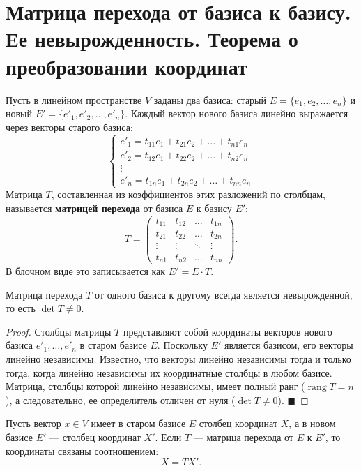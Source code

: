 \section{Матрица перехода от базиса к базису. Ее невырожденность. Теорема о преобразовании координат}

\begin{definition}
Пусть в линейном пространстве $V$ заданы два базиса: старый $E = \{e_1, e_2, \dots, e_n\}$ и новый $E' = \{e'_1, e'_2, \dots, e'_n\}$. 
Каждый вектор нового базиса линейно выражается через векторы старого базиса:
\[
\begin{cases}
e'_1 = t_{11}e_1 + t_{21}e_2 + \dots + t_{n1}e_n \\
e'_2 = t_{12}e_1 + t_{22}e_2 + \dots + t_{n2}e_n \\
\vdots \\
e'_n = t_{1n}e_1 + t_{2n}e_2 + \dots + t_{nn}e_n
\end{cases}
\]
Матрица $T$, составленная из коэффициентов этих разложений по столбцам, называется \textbf{матрицей перехода} от базиса $E$ к базису $E'$:
\[
T = \begin{pmatrix}
t_{11} & t_{12} & \dots & t_{1n} \\
t_{21} & t_{22} & \dots & t_{2n} \\
\vdots & \vdots & \ddots & \vdots \\
t_{n1} & t_{n2} & \dots & t_{nn}
\end{pmatrix}.
\]
В блочном виде это записывается как $E' = E \cdot T$.
\end{definition}

\begin{theorem}
Матрица перехода $T$ от одного базиса к другому всегда является невырожденной, то есть $\det T \neq 0$.
\end{theorem}

\begin{proof}
Столбцы матрицы $T$ представляют собой координаты векторов нового базиса $e'_1, \dots, e'_n$ в старом базисе $E$. 
Поскольку $E'$ является базисом, его векторы линейно независимы. 
Известно, что векторы линейно независимы тогда и только тогда, когда линейно независимы их координатные столбцы в любом базисе. 
Матрица, столбцы которой линейно независимы, имеет полный ранг ($\operatorname{rang} T = n$), а следовательно, ее определитель отличен от нуля ($\det T \neq 0$).
\hfill$\blacksquare$
\end{proof}

\begin{theorem}
Пусть вектор $x \in V$ имеет в старом базисе $E$ столбец координат $X$, а в новом базисе $E'$ --- столбец координат $X'$. Если $T$ --- матрица перехода от $E$ к $E'$, то координаты связаны соотношением:
\[
X = T X'.
\]
\end{theorem}


